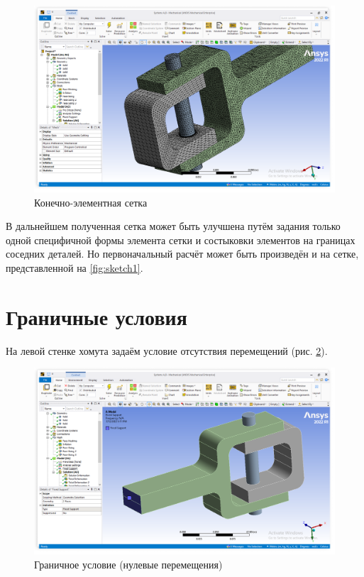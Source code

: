 \begin{figure}[H] 
	\center
	\includegraphics[width=\textwidth]{images/mesh.png}
	\caption{Конечно-элементная сетка}
	\label{fig:mesh}
\end{figure}

В дальнейшем полученная сетка может быть улучшена путём задания только одной специфичной формы элемента сетки и состыковки элементов на границах соседних деталей. Но первоначальный расчёт может быть произведён и на сетке, представленной на \ref{fig:sketch1}.

\section{Граничные условия} \label{ch2:conclusion}

На левой стенке хомута задаём условие отсутствия перемещений (рис. \ref{fig:gu}).

\begin{figure}[H] 
	\center
	\includegraphics[width=\textwidth]{images/gu.png}
	\caption{Граничное условие (нулевые перемещения)}
	\label{fig:gu}
\end{figure}





